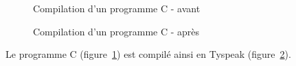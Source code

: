 \begin{figure} %


  \caption{Compilation d'un programme C - avant}
  \label{fig:exunif:c}
\end{figure}

\begin{figure}


  \caption{Compilation d'un programme C - après}
  \label{fig:exunif:tpk}
\end{figure} %

Le programme C (figure~\ref{fig:exunif:c}) est compilé ainsi en Tyspeak
(figure~\ref{fig:exunif:tpk}).

